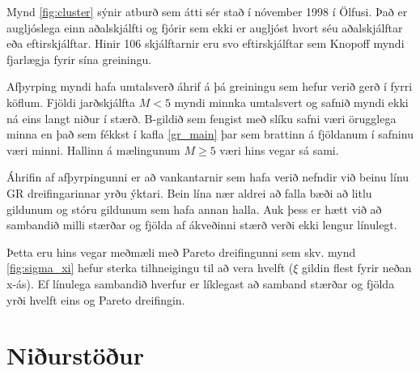 \documentclass[10pt,a4paper,titlepage,twoside]{article}
\newcommand{\note}[1]{\textcolor{ymagray}{\textbf{[#1]}}}
\begin{document}
Mynd \ref{fig:cluster} sýnir atburð sem átti sér stað í nóvember 1998 í Ölfusi. Það er augljóslega einn aðalskjálfti og fjórir sem ekki er augljóst hvort séu aðalskjálftar eða eftirskjálftar. Hinir 106 skjálftarnir eru svo eftirskjálftar sem Knopoff myndi fjarlægja fyrir sína greiningu.

Afþyrping myndi hafa umtalsverð áhrif á þá greiningu sem hefur verið gerð í fyrri köflum. Fjöldi jarðskjálfta $M<5$ myndi minnka umtalsvert og safnið myndi ekki ná eins langt niður í stærð. B-gildið sem fengist með slíku safni væri örugglega minna en það sem fékkst í kafla \ref{gr_main} þar sem brattinn á fjöldanum í safninu væri minni. Hallinn á mælingunum $M\geq5$ væri hins vegar sá sami.

Áhrifin af afþyrpingunni er að vankantarnir sem hafa verið nefndir við beinu línu GR dreifingarinnar yrðu ýktari. Bein lína nær aldrei að falla bæði að litlu gildunum og stóru gildunum sem hafa annan halla. Auk þess er hætt við að sambandið milli stærðar og fjölda af ákveðinni stærð verði ekki lengur línulegt.

Þetta eru hins vegar meðmæli með Pareto dreifingunni sem skv. mynd \ref{fig:sigma_xi} hefur sterka tilhneigingu til að vera hvelft ($\xi$ gildin flest fyrir neðan x-ás). Ef línulega sambandið hverfur er líklegast að samband stærðar og fjölda yrði hvelft eins og Pareto dreifingin.





\clearpage
\section{Niðurstöður}
\end{document}

